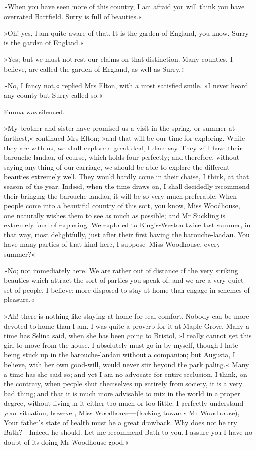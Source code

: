 »When you have seen more of this country, I am afraid you will think you have overrated Hartfield. Surry is full of beauties.«

»Oh! yes, I am quite aware of that. It is the garden of England, you know. Surry is the garden of England.«

»Yes; but we must not rest our claims on that distinction. Many counties, I believe, are called the garden of England, as well as Surry.«

»No, I fancy not,« replied Mrs Elton, with a most satisfied smile. »I never heard any county but Surry called so.«

Emma was silenced.

»My brother and sister have promised us a visit in the spring, or summer at farthest,« continued Mrs Elton; »and that will be our time for exploring. While they are with us, we shall explore a great deal, I dare say. They will have their barouche-landau, of course, which holds four perfectly; and therefore, without saying any thing of our carriage, we should be able to explore the different beauties extremely well. They would hardly come in their chaise, I think, at that season of the year. Indeed, when the time draws on, I shall decidedly recommend their bringing the barouche-landau; it will be so very much preferable. When people come into a beautiful country of this sort, you know, Miss Woodhouse, one naturally wishes them to see as much as possible; and Mr Suckling is extremely fond of exploring. We explored to King's-Weston twice last summer, in that way, most delightfully, just after their first having the barouche-landau. You have many parties of that kind here, I suppose, Miss Woodhouse, every summer?«

»No; not immediately here. We are rather out of distance of the very striking beauties which attract the sort of parties you speak of; and we are a very quiet set of people, I believe; more disposed to stay at home than engage in schemes of pleasure.«

»Ah! there is nothing like staying at home for real comfort. Nobody can be more devoted to home than I am. I was quite a proverb for it at Maple Grove. Many a time has Selina said, when she has been going to Bristol, »I really cannot get this girl to move from the house. I absolutely must go in by myself, though I hate being stuck up in the barouche-landau without a companion; but Augusta, I believe, with her own good-will, would never stir beyond the park paling.« Many a time has she said so; and yet I am no advocate for entire seclusion. I think, on the contrary, when people shut themselves up entirely from society, it is a very bad thing; and that it is much more advisable to mix in the world in a proper degree, without living in it either too much or too little. I perfectly understand your situation, however, Miss Woodhouse—(looking towards Mr Woodhouse), Your father's state of health must be a great drawback. Why does not he try Bath?—Indeed he should. Let me recommend Bath to you. I assure you I have no doubt of its doing Mr Woodhouse good.«

